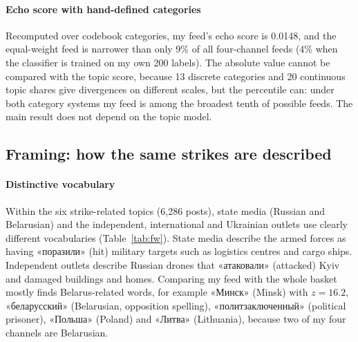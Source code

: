 \documentclass[11pt,a4paper]{article}
\newcommand{\ru}[2]{«#1» (#2)}
\begin{document}
\paragraph{Echo score with hand-defined categories} Recomputed over codebook categories, my feed's echo score is 0.0148, and the equal-weight feed is narrower than only 9\% of all four-channel feeds (4\% when the classifier is trained on my own 200 labels). The absolute value cannot be compared with the topic score, because 13 discrete categories and 20 continuous topic shares give divergences on different scales, but the percentile can: under both category systems my feed is among the broadest tenth of possible feeds. The main result does not depend on the topic model.

\subsection{Framing: how the same strikes are described}
\label{sec:res-framing}
\paragraph{Distinctive vocabulary} Within the six strike-related topics (6,286 posts), state media (Russian and Belarusian) and the independent, international and Ukrainian outlets use clearly different vocabularies (Table~\ref{tab:fw}). State media describe the armed forces as having \ru{поразили}{hit} military targets such as logistics centres and cargo ships. Independent outlets describe Russian drones that \ru{атаковали}{attacked} Kyiv and damaged buildings and homes. Comparing my feed with the whole basket mostly finds Belarus-related words, for example \ru{Минск}{Minsk} with $z=16.2$, «беларусский» (Belarusian, opposition spelling), \ru{политзаключенный}{political prisoner}, \ru{Польша}{Poland} and \ru{Литва}{Lithuania}, because two of my four channels are Belarusian.
\end{document}
